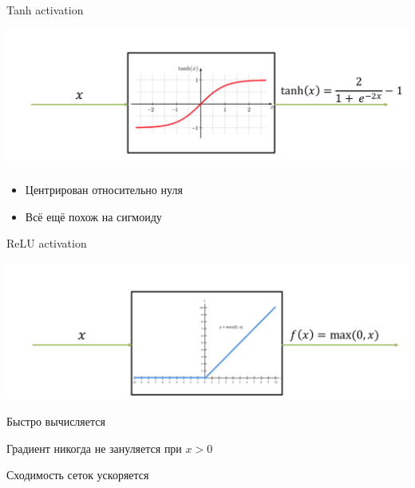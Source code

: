 \documentclass[notes,12pt, aspectratio=169]{beamer}
\begin{document}
\begin{frame}{Tanh activation}
\begin{center}
	\includegraphics[width=.8\linewidth]{tanh_activation.png}
\end{center}

\begin{itemize}
	\item  {\color{green}  Центрирован относительно нуля }
	
	\item  {\color{red}  Всё ещё похож на сигмоиду }
	
\end{itemize}
\end{frame}


\begin{frame}{ReLU activation}
\begin{center}
	\includegraphics[width=.8\linewidth]{relu_activation.png}
\end{center}

\begin{itemize}
	{ \color{green} 
		\item  Быстро вычисляется 
		
		\item  Градиент никогда не зануляется при $x > 0$
		
		\item  Сходимость сеток ускоряется 
	} 
\end{itemize}
\end{frame}
\end{document}
